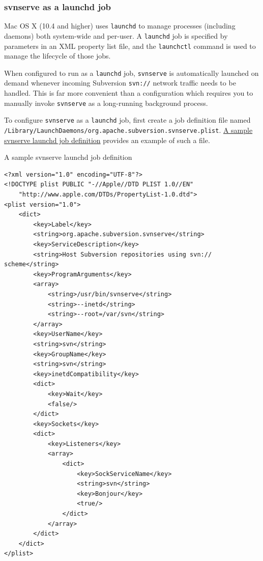 \subsubsection{svnserve as a launchd
job}\label{svn.serverconfig.svnserve.invoking.launchd}

Mac OS X (10.4 and higher) uses \texttt{launchd} to manage processes
(including daemons) both system-wide and per-user. A \texttt{launchd}
job is specified by parameters in an XML property list file, and the
\texttt{launchctl} command is used to manage the lifecycle of those
jobs.

When configured to run as a \texttt{launchd} job, \texttt{svnserve} is
automatically launched on demand whenever incoming Subversion
\texttt{svn://} network traffic needs to be handled. This is far more
convenient than a configuration which requires you to manually invoke
\texttt{svnserve} as a long-running background process.

To configure \texttt{svnserve} as a \texttt{launchd} job, first create a
job definition file named
\texttt{/Library/LaunchDaemons/org.apache.subversion.svnserve.plist}.
\hyperref[svn.serverconfig.svnserve.invoking.launchd.ex-1]{A sample
svnserve launchd job definition} provides an example of such a file.

\protect{}\label{svn.serverconfig.svnserve.invoking.launchd.ex-1}
A sample svnserve launchd job definition

\begin{verbatim}
<?xml version="1.0" encoding="UTF-8"?>
<!DOCTYPE plist PUBLIC "-//Apple//DTD PLIST 1.0//EN"
    "http://www.apple.com/DTDs/PropertyList-1.0.dtd">
<plist version="1.0">
    <dict>
        <key>Label</key>
        <string>org.apache.subversion.svnserve</string>
        <key>ServiceDescription</key>
        <string>Host Subversion repositories using svn:// scheme</string>
        <key>ProgramArguments</key>
        <array>
            <string>/usr/bin/svnserve</string>
            <string>--inetd</string>
            <string>--root=/var/svn</string>
        </array>
        <key>UserName</key>
        <string>svn</string>
        <key>GroupName</key>
        <string>svn</string>
        <key>inetdCompatibility</key>
        <dict>
            <key>Wait</key>
            <false/>
        </dict>
        <key>Sockets</key>
        <dict>
            <key>Listeners</key>
            <array>
                <dict>
                    <key>SockServiceName</key>
                    <string>svn</string>
                    <key>Bonjour</key>
                    <true/>
                </dict>
            </array>
        </dict>
    </dict>
</plist>
\end{verbatim}

